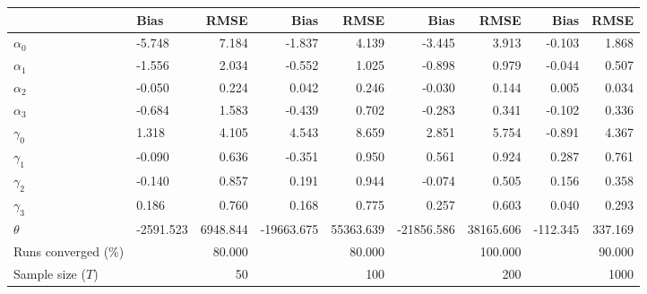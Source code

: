 
\begin{tabular}[t]{llrrrrrrr}
\toprule
  & Bias & RMSE & Bias & RMSE & Bias & RMSE & Bias & RMSE\\
\midrule
$\alpha_{0}$ & -5.748 & 7.184 & -1.837 & 4.139 & -3.445 & 3.913 & -0.103 & 1.868\\
$\alpha_{1}$ & -1.556 & 2.034 & -0.552 & 1.025 & -0.898 & 0.979 & -0.044 & 0.507\\
$\alpha_{2}$ & -0.050 & 0.224 & 0.042 & 0.246 & -0.030 & 0.144 & 0.005 & 0.034\\
$\alpha_{3}$ & -0.684 & 1.583 & -0.439 & 0.702 & -0.283 & 0.341 & -0.102 & 0.336\\
$\gamma_{0}$ & 1.318 & 4.105 & 4.543 & 8.659 & 2.851 & 5.754 & -0.891 & 4.367\\
$\gamma_{1}$ & -0.090 & 0.636 & -0.351 & 0.950 & 0.561 & 0.924 & 0.287 & 0.761\\
$\gamma_{2}$ & -0.140 & 0.857 & 0.191 & 0.944 & -0.074 & 0.505 & 0.156 & 0.358\\
$\gamma_{3}$ & 0.186 & 0.760 & 0.168 & 0.775 & 0.257 & 0.603 & 0.040 & 0.293\\
$\theta$ & -2591.523 & 6948.844 & -19663.675 & 55363.639 & -21856.586 & 38165.606 & -112.345 & 337.169\\
Runs converged (\%) &  & 80.000 &  & 80.000 &  & 100.000 &  & 90.000\\
Sample size ($T$) &  & 50 &  & 100 &  & 200 &  & 1000\\
\bottomrule
\end{tabular}
